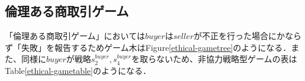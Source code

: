 \documentclass[twocolumn, a4j]{article}
\begin{document}

%

\subsection{倫理ある商取引ゲーム}
「倫理ある商取引ゲーム」においては$buyer$は$seller$が不正を行った場合にかならず「失敗」を報告するためゲーム木はFigure\ref{ethical-gametree}のようになる．また、同様に$buyer$が戦略$s^{buyer}_2, s^{buyer}_4$を取らないため、非協力戦略型ゲームの表はTable\ref{ethical-gametable}のようになる．
\end{document}
